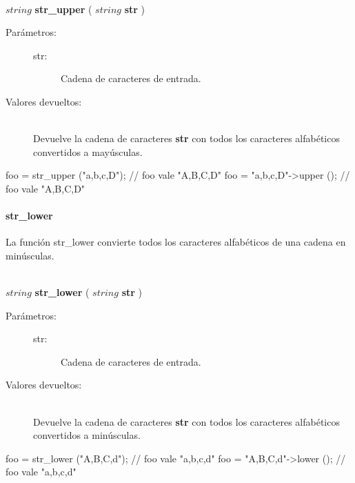 \begin{framed}
\hfill \\ $string$ \textbf{str\_upper} ( $string$ \textbf{str} )  
\begin{description}
\item [Parámetros:] \hfill 
   \begin{description}
   \item[str:] Cadena de caracteres de entrada.
   \end{description}
\item[Valores devueltos:] \hfill \\
   Devuelve la cadena de caracteres \textbf{str} con todos los caracteres alfabéticos convertidos a mayúsculas.
\end{description}
\end{framed}

\begin{myverbatim}
   foo = str_upper ("a,b,c,D"); // foo vale "A,B,C,D"
   foo = "a,b,c,D"->upper (); // foo vale "A,B,C,D" 
\end{myverbatim}

\paragraph{str\_lower}
La función str\_lower convierte todos los caracteres alfabéticos de una cadena en minúsculas. 

\begin{framed}
\hfill \\ $string$ \textbf{str\_lower} ( $string$ \textbf{str} )  
\begin{description}
\item [Parámetros:] \hfill 
   \begin{description}
   \item[str:] Cadena de caracteres de entrada.
   \end{description}
\item[Valores devueltos:] \hfill \\
   Devuelve la cadena de caracteres \textbf{str} con todos los caracteres alfabéticos convertidos a minúsculas.
\end{description}
\end{framed}

\begin{myverbatim}   
   foo = str_lower ("A,B,C,d"); // foo vale "a,b,c,d"
   foo = "A,B,C,d"->lower (); // foo vale "a,b,c,d" 
\end{myverbatim}

